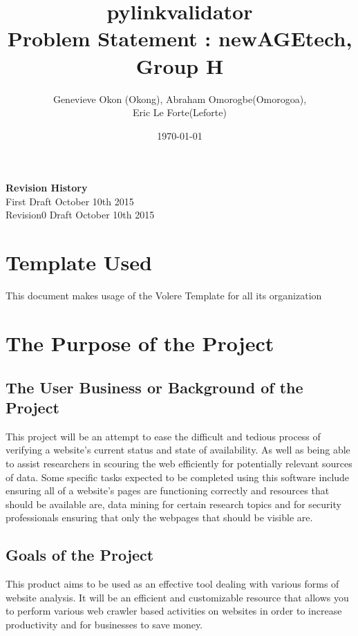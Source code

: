 \documentclass[titlepage]{article}
\begin{document}
\title{pylinkvalidator \\
 Problem Statement : newAGEtech, Group H }
\author{Genevieve Okon (Okong), Abraham Omorogbe(Omorogoa),\\
 Eric Le Forte(Leforte)}
\date{\today}
\maketitle


\tableofcontents
\listoffigures
\listoftables

\textbf{Revision History} \\ \normalsize
First Draft October 10th 2015\\
Revision0 Draft October 10th 2015\\
\clearpage




\section *{Template Used}
This document makes usage of the Volere Template for all its organization



\section{The Purpose of the Project}

\subsection*{The User Business or Background of the Project}
This project will be an attempt to ease the difficult and tedious process of verifying a website’s current status and state of availability. As well as being able to assist researchers in scouring the web efficiently for potentially relevant sources of data. Some specific tasks expected to be completed using this software include ensuring all of a website’s pages are functioning correctly and resources that should be available are, data mining for certain research topics and for security professionals ensuring that only the webpages that should be visible are.

\subsection*{Goals of the Project}
This product aims to be used as an effective tool dealing with various forms of website analysis. It will be an efficient and customizable resource that allows you to perform various web crawler based activities on websites in order to increase productivity and for businesses to save money.
\end{document}
